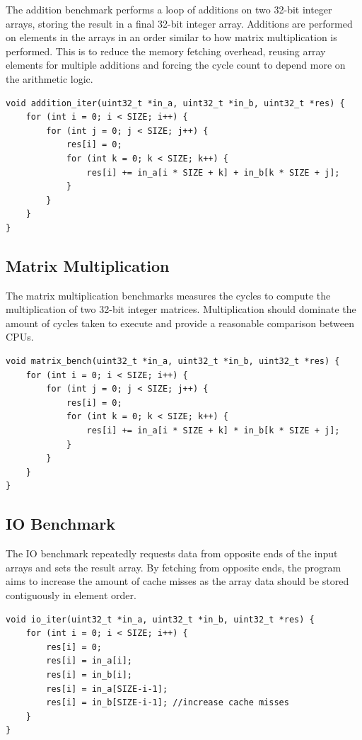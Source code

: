 The addition benchmark performs a loop of additions on two 32-bit integer arrays, storing the result in a final 32-bit integer array. Additions are performed on elements in the arrays in an order similar to how matrix multiplication is performed. This is to reduce the memory fetching overhead, reusing array elements for multiple additions and forcing the cycle count to depend more on the arithmetic logic.

\begin{verbatim}
void addition_iter(uint32_t *in_a, uint32_t *in_b, uint32_t *res) {
    for (int i = 0; i < SIZE; i++) {
        for (int j = 0; j < SIZE; j++) {
            res[i] = 0;
            for (int k = 0; k < SIZE; k++) {
                res[i] += in_a[i * SIZE + k] + in_b[k * SIZE + j];
            }
        }
    }
}
\end{verbatim}

\subsection{Matrix Multiplication}
The matrix multiplication benchmarks measures the cycles to compute the multiplication of two 32-bit integer matrices. Multiplication should dominate the amount of cycles taken to execute and provide a reasonable comparison between CPUs.

\begin{verbatim}
void matrix_bench(uint32_t *in_a, uint32_t *in_b, uint32_t *res) {
    for (int i = 0; i < SIZE; i++) {
        for (int j = 0; j < SIZE; j++) {
            res[i] = 0;
            for (int k = 0; k < SIZE; k++) {
                res[i] += in_a[i * SIZE + k] * in_b[k * SIZE + j];
            }
        }
    }
}
\end{verbatim}

\subsection{IO Benchmark}
The IO benchmark repeatedly requests data from opposite ends of the input arrays and sets the result array. By fetching from opposite ends, the program aims to increase the amount of cache misses as the array data should be stored contiguously in element order.

\begin{verbatim}
void io_iter(uint32_t *in_a, uint32_t *in_b, uint32_t *res) {
    for (int i = 0; i < SIZE; i++) {
        res[i] = 0;
        res[i] = in_a[i];
        res[i] = in_b[i];
        res[i] = in_a[SIZE-i-1];
        res[i] = in_b[SIZE-i-1]; //increase cache misses
    }
}
\end{verbatim}

